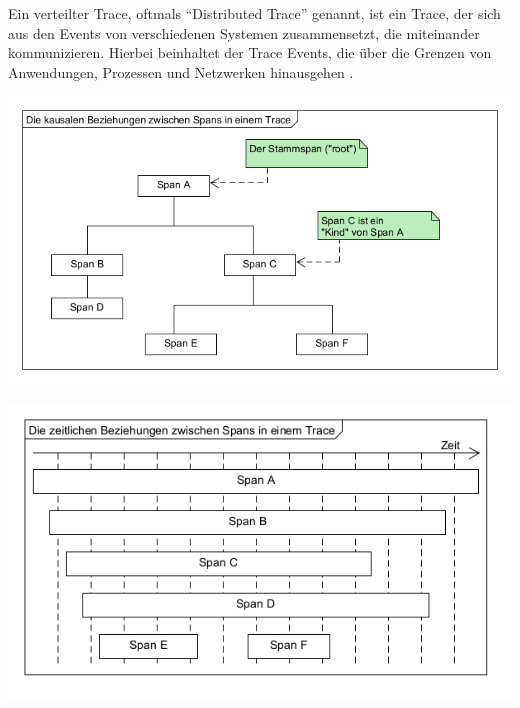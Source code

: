 Ein verteilter Trace, oftmals \enquote{Distributed Trace} genannt, ist ein Trace, der sich aus den Events von verschiedenen Systemen zusammensetzt, die miteinander kommunizieren. Hierbei beinhaltet der Trace Events, die über die Grenzen von Anwendungen, Prozessen und Netzwerken hinausgehen \cite{OpenTracingSpecification}.

\begin{minipage}{.47\textwidth}
	\centering
	\includegraphics[width=\linewidth]{img/03_methoden/otel_causal-relationship.png}
	\label{fig:otel-causal-relationship}
\end{minipage}%
\hspace{.06\textwidth}
\begin{minipage}{.47\textwidth}
	\centering
	\includegraphics[width=\linewidth]{img/03_methoden/otel_temporal-relationship}
	\label{fig:otel-temporal-relationship}
\end{minipage}

